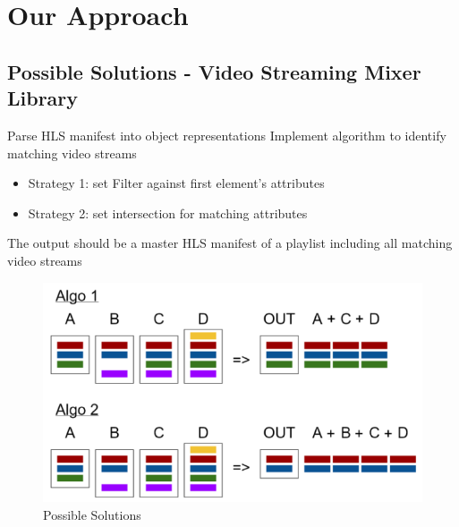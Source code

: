 \section{\textbf{Our Approach}}\label{sec:main}
 \subsection{ Possible Solutions - Video Streaming Mixer Library
}


Parse HLS manifest into object representations
Implement algorithm to identify matching video streams

 \begin{itemize}

     \item Strategy 1: set Filter against first element’s attributes
     \item  Strategy 2: set intersection for matching attributes

 \end{itemize}
 The output should be a master HLS manifest of a playlist including all matching video streams

 
\begin{figure}

\centering
\includegraphics[scale=0.50]{figures/PossibleSolutions.png}
\caption{Possible Solutions }
\label{fig:IMT_2020_Use-cases}
\end{figure}


